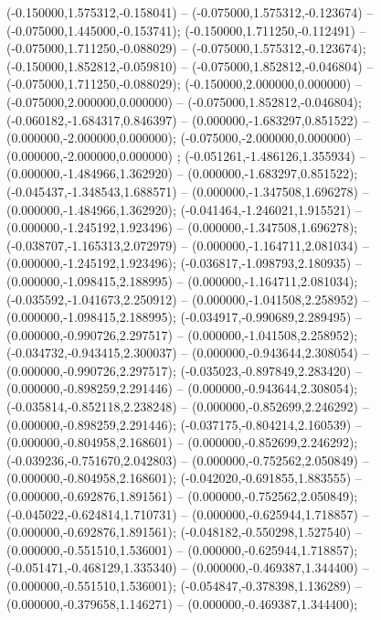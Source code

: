  (-0.150000,1.575312,-0.158041) -- (-0.075000,1.575312,-0.123674) -- (-0.075000,1.445000,-0.153741);
 (-0.150000,1.711250,-0.112491) -- (-0.075000,1.711250,-0.088029) -- (-0.075000,1.575312,-0.123674);
 (-0.150000,1.852812,-0.059810) -- (-0.075000,1.852812,-0.046804) -- (-0.075000,1.711250,-0.088029);
 (-0.150000,2.000000,0.000000) -- (-0.075000,2.000000,0.000000) -- (-0.075000,1.852812,-0.046804);
 (-0.060182,-1.684317,0.846397) -- (0.000000,-1.683297,0.851522) -- (0.000000,-2.000000,0.000000);
 (-0.075000,-2.000000,0.000000) -- (0.000000,-2.000000,0.000000) ;
 (-0.051261,-1.486126,1.355934) -- (0.000000,-1.484966,1.362920) -- (0.000000,-1.683297,0.851522);
 (-0.045437,-1.348543,1.688571) -- (0.000000,-1.347508,1.696278) -- (0.000000,-1.484966,1.362920);
 (-0.041464,-1.246021,1.915521) -- (0.000000,-1.245192,1.923496) -- (0.000000,-1.347508,1.696278);
 (-0.038707,-1.165313,2.072979) -- (0.000000,-1.164711,2.081034) -- (0.000000,-1.245192,1.923496);
 (-0.036817,-1.098793,2.180935) -- (0.000000,-1.098415,2.188995) -- (0.000000,-1.164711,2.081034);
 (-0.035592,-1.041673,2.250912) -- (0.000000,-1.041508,2.258952) -- (0.000000,-1.098415,2.188995);
 (-0.034917,-0.990689,2.289495) -- (0.000000,-0.990726,2.297517) -- (0.000000,-1.041508,2.258952);
 (-0.034732,-0.943415,2.300037) -- (0.000000,-0.943644,2.308054) -- (0.000000,-0.990726,2.297517);
 (-0.035023,-0.897849,2.283420) -- (0.000000,-0.898259,2.291446) -- (0.000000,-0.943644,2.308054);
 (-0.035814,-0.852118,2.238248) -- (0.000000,-0.852699,2.246292) -- (0.000000,-0.898259,2.291446);
 (-0.037175,-0.804214,2.160539) -- (0.000000,-0.804958,2.168601) -- (0.000000,-0.852699,2.246292);
 (-0.039236,-0.751670,2.042803) -- (0.000000,-0.752562,2.050849) -- (0.000000,-0.804958,2.168601);
 (-0.042020,-0.691855,1.883555) -- (0.000000,-0.692876,1.891561) -- (0.000000,-0.752562,2.050849);
 (-0.045022,-0.624814,1.710731) -- (0.000000,-0.625944,1.718857) -- (0.000000,-0.692876,1.891561);
 (-0.048182,-0.550298,1.527540) -- (0.000000,-0.551510,1.536001) -- (0.000000,-0.625944,1.718857);
 (-0.051471,-0.468129,1.335340) -- (0.000000,-0.469387,1.344400) -- (0.000000,-0.551510,1.536001);
 (-0.054847,-0.378398,1.136289) -- (0.000000,-0.379658,1.146271) -- (0.000000,-0.469387,1.344400);

